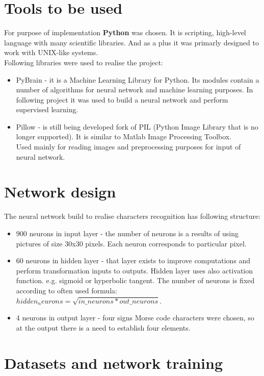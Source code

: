\documentclass[eng,openany]{mgr}
\begin{document}
\section{Tools to be used}
For purpose of implementation \textbf{Python} was chosen. It is scripting, high-level language with many scientific libraries. And as a plus it was primarly designed to work with UNIX-like systems.\\
Following libraries were used to realise the project:
\begin{itemize}
\item PyBrain - it is a Machine Learning Library for Python. Its modules contain a number of algorithms for neural network and machine learning purposes. In following project it was used to build a neural network and perform supervised learning.
\item Pillow - is still being developed fork of PIL (Python Image Library that is no longer supported). It is similar to Matlab Image Processing Toolbox.\\
Used mainly for reading images and preprocessing purposes for input of neural network.
\end{itemize}
\section{Network design}
The neural network build to realise characters recognition has following structure:
\begin{itemize}
\item 900 neurons in input layer - the number of neurons is a results of using pictures of size 30x30 pixels. Each neuron corresponds to particular pixel.
\item 60 neurons in hidden layer - that layer exists to improve computations and perform transformation inputs to outputs. Hidden layer uses also activation function. e.g. sigmoid or hyperbolic tangent.
The number of neurons is fixed according to often used formula:\\ $hidden_neurons = \sqrt{in\_neurons * out\_neurons}$.
\item 4 neurons in output layer - four signs Morse code characters were chosen, so at the output there is a need to establish four elements.
\end{itemize}
\newpage
\section{Datasets and network training}
\end{document}
